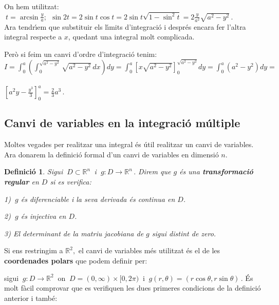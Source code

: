 \documentclass[12pt]{article}
\newtheorem{definicio}{Definici{\'o}}[subsection]
\newcommand{\R}{\mathbb{R}}
\begin{document}
On hem utilitzat: $\ t=\arcsin \frac{y}{a}; \ \ \sin 2t=2\sin t \cos
t=2 \sin t \sqrt{1-\sin^2 t}=2 \frac{y}{a^2}\sqrt{a^2-y^2}\,.$\\

Ara tendr{\'\i}em que substituir els l{\'\i}mits d'integraci{\'o} i despr{\'e}s encara
fer l'altra integral respecte a $x$, quedant una integral molt
complicada.

Per{\`o} si feim un canvi d'ordre
d'integraci{\'o} tenim:\\

\hspace*{1cm}$\displaystyle
I=\int_0^a\left(\int_0^{\sqrt{a^2-y^2}}\sqrt{a^2-y^2}\,dx\right)dy=
\int_0^a\left[x\sqrt{a^2-y^2}\right]_0^{\sqrt{a^2-y^2}}dy=
\int_0^a(a^2-y^2)dy=$\\\\

\hspace*{1cm}$\displaystyle\left[a^2y-\frac{y^3}{3}\right]_0^a=\frac{2}{3}a^3\,.$

\vspace*{1cm}
\subsection{Canvi de variables en la integraci{\'o} m{\'u}ltiple}

Moltes vegades per realitzar una integral {\'e}s {\'u}til realitzar un canvi
de variables. Ara donarem la definici{\'o} formal d'un canvi de
variables en dimensi{\'o} $n$.

\begin{definicio}
Sigui $\ D\subset\R^n\,$ i $\ g:D\to \R^n\,.$ Direm que $g$ {\'e}s una
\textbf{transformaci{\'o} regular} en $D$ si es verifica:

\hspace*{2cm} 1) $\ g$ {\'e}s diferenciable i la seva derivada {\'e}s
continua en $D$.

\hspace*{2cm} 2) $\ g$ {\'e}s injectiva en $D$.

\hspace*{2cm} 3) El determinant de la matriu jacobiana de $g$ sigui distint de zero.
\end{definicio}

Si ens restringim a $\R^2,$ el canvi de variables m{\'e}s utilitzat {\'e}s
el de les \textbf{coordenades polars} que podem definir per:

sigui $\ g:D\to \R^2\ $ on $\ D=(0,\infty)\times[0,2\pi)\ $ i $\
g(r,\theta)=(r\cos \theta,r\sin \theta)\,. $ {\'E}s molt f{\`a}cil comprovar
que es verifiquen les dues primeres condicions de la definici{\'o}
anterior i tamb{\'e}:
\end{document}
